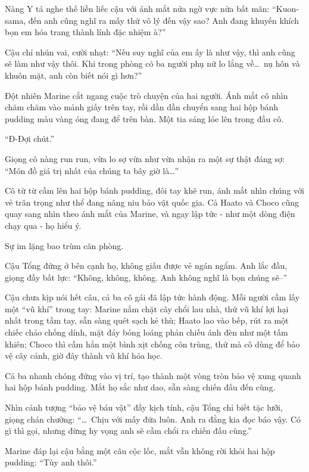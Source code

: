 \documentclass[../main.tex]{subfiles}
\begin{document}
Nàng Y tá nghe thế liền liếc cậu với ánh mắt nửa ngờ vực nửa bất mãn: ``Kuon-sama, đến anh cũng nghĩ ra mấy thứ vô lý đến vậy sao? Anh đang khuyến khích bọn em hóa trang thành lính đặc nhiệm à?''

Cậu chỉ nhún vai, cười nhạt: ``Nếu suy nghĩ của em ấy là như vậy, thì anh cũng sẽ làm như vậy thôi. Khi trong phòng có ba người phụ nữ lo lắng về\dots\ nụ hôn và khuôn mặt, anh còn biết nói gì hơn?''

Đột nhiên Marine cắt ngang cuộc trò chuyện của hai người. Ánh mắt cô nhìn chăm chăm vào mảnh giấy trên tay, rồi dần dần chuyển sang hai hộp bánh pudding màu vàng óng đang để trên bàn. Một tia sáng lóe lên trong đầu cô.

``Đ-Đợi chút.''

Giọng cô nàng run run, vừa lo sợ vừa như vừa nhận ra một sự thật đáng sợ: ``Món đồ giá trị nhất của chúng ta bây giờ là\dots''


Cô từ từ cầm lên hai hộp bánh pudding, đôi tay khẽ run, ánh mắt nhìn chúng với vẻ trân trọng như thể đang nâng niu bảo vật quốc gia. Cả Haato và Choco cũng quay sang nhìn theo ánh mắt của Marine, và ngay lập tức - như một dòng điện chạy qua - họ hiểu ý.

Sự im lặng bao trùm căn phòng.

Cậu Tổng đứng ở bên cạnh họ, không giấu được vẻ ngán ngẩm. Anh lắc đầu, giọng đầy bất lực: ``Không, không, không. Anh không nghĩ là bọn chúng sẽ--''

Cậu chưa kịp nói hết câu, cả ba cô gái đã lập tức hành động. Mỗi người cầm lấy một ``vũ khí'' trong tay: Marine nắm chặt cây chổi lau nhà, thứ vũ khí lợi hại nhất trong tầm tay, sẵn sàng quét sạch kẻ thù;  Haato lao vào bếp, rút ra một chiếc chảo chống dính, mặt đáy bóng loáng phản chiếu ánh đèn như một tấm khiên; Choco thì cầm hẳn một bình xịt chống côn trùng, thứ mà cô dùng để bảo vệ cây cảnh, giờ đây thành vũ khí hóa học.

Cả ba nhanh chóng đứng vào vị trí, tạo thành một vòng tròn bảo vệ xung quanh hai hộp bánh pudding. Mắt họ sắc như dao, sẵn sàng chiến đấu đến cùng.


Nhìn cảnh tượng ``bảo vệ báu vật'' đầy kịch tính, cậu Tổng chỉ biết tặc lưỡi, giọng chán chường: ``\dots\ Chịu với mấy đứa luôn. Anh ra đằng kia đọc báo vậy. Có gì thì gọi, nhưng đừng hy vọng anh sẽ cầm chổi ra chiến đấu cùng.''

Marine đáp lại cậu bằng một câu cộc lốc, mắt vẫn không rời khỏi hai hộp pudding: ``Tùy anh thôi.''
\end{document}
